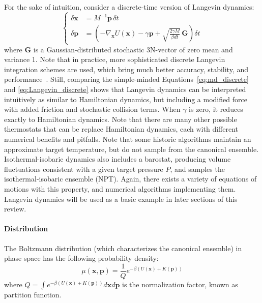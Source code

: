 \documentclass[9pt,review]{livecoms}
\newcommand{\vx}{\mathbf{x}}
\newcommand{\vp}{\mathbf{p}}
\begin{document}
For the sake of intuition, consider a discrete-time version of Langevin dynamics:
\begin{equation}
\left\{
\begin{array}{ll}
    \delta\vx &= M^{-1} \vp \, \delta t \\
    \delta\vp &= \left(-\nabla_\vx U(\vx) - \gamma \vp + \sqrt{ \frac{2 \gamma M}{ \beta dt}} \, \mathbf{G} \right) \delta t
    \label{eq:Langevin_discrete}
\end{array}
\right.
\end{equation}
where $\mathbf{G}$ is a Gaussian-distributed stochastic 3N-vector of zero mean and variance 1.
Note that in practice, more sophisticated discrete Langevin integration schemes are used, which bring much better accuracy, stability, and performance~\cite{Skeel2002, Leimkuhler2012}.
Still, comparing the simple-minded Equations~\ref{eq:md_discrete} and \ref{eq:Langevin_discrete} shows that Langevin dynamics can be interpreted intuitively as similar to Hamiltonian dynamics, but including a modified force with added friction and stochastic collision terms. When $\gamma$ is zero, it reduces exactly to Hamiltonian dynamics.
Note that there are many other possible thermostats that can be replace Hamiltonian dynamics, each with different numerical benefits and pitfalls. Note that some historic algorithms maintain an approximate target temperature, but do not sample from the canonical ensemble.
Isothermal-isobaric dynamics also includes a barostat, producing volume fluctuations consistent with a given target pressure $P$, and samples the isothermal-isobaric ensemble (NPT).
Again, there exists a variety of equations of motions with this property, and numerical algorithms implementing them. Langevin dynamics will be used as a basic example in later sections of this review.

\hypertarget{ref:Distribution}{\paragraph{Distribution}}

The Boltzmann distribution (which characterizes the canonical ensemble) in phase space has the following probability density:
\begin{equation}
\mu(\vx, \vp) = \frac{1}{Q} e^{-\beta (U(\vx) + K(\vp))}
\label{eq:BoltzmannDistr}
\end{equation}
where $ \displaystyle Q = \int e^{-\beta (U(\vx) + K(\vp))} d\vx d\vp$ is the normalization factor, known as partition function.
\end{document}

